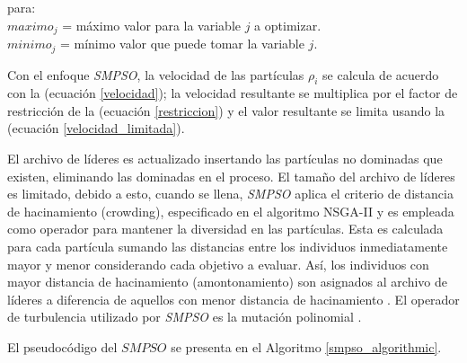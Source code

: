 para:\\
$maximo_j$ = máximo valor para la variable $j$ a optimizar.\\
$minimo_j$ = mínimo valor que puede tomar la variable  $j$.

Con el enfoque \textit{SMPSO}, la velocidad de las partículas $\rho_i$ se calcula de acuerdo con la (ecuación \ref{velocidad}); la velocidad resultante se multiplica por el factor de restricción de la (ecuación \ref{restriccion}) y el valor resultante se limita usando la (ecuación \ref{velocidad_limitada}).

El archivo de líderes es actualizado insertando las partículas no dominadas que existen, eliminando las dominadas en el proceso. El tamaño del archivo de líderes es limitado, debido a esto, cuando se llena, \textit{SMPSO} aplica el criterio de distancia de hacinamiento (crowding), especificado en el algoritmo NSGA-II \cite{NSGA} y es empleada como operador para mantener la diversidad en las partículas. Esta es calculada para cada partícula sumando las distancias entre los individuos inmediatamente mayor y menor considerando cada objetivo a evaluar. Así, los individuos con mayor distancia de hacinamiento (amontonamiento) son asignados al archivo de líderes a diferencia de aquellos con menor distancia de hacinamiento \cite{daumasjara}.
El operador de turbulencia utilizado por \textit{SMPSO} es la mutación polinomial \cite{polinomial}.

El pseudocódigo del $SMPSO$ se presenta en el Algoritmo  \ref{smpso_algorithmic}.


